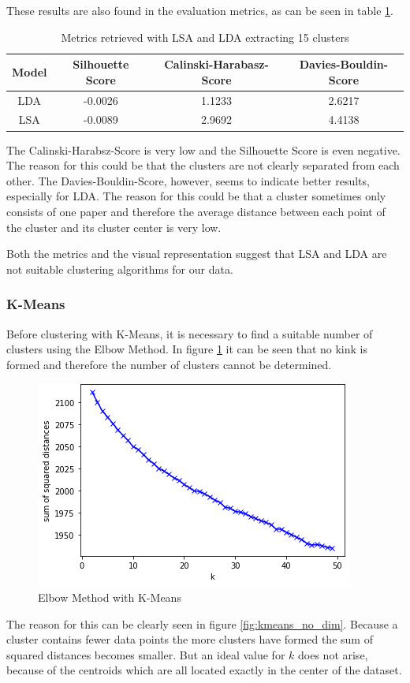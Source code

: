 These results are also found in the evaluation metrics, as can be seen in table \ref{tab:scores_lsa_lda}.
\begin{table}[]
    \centering
    \begin{tabular}{c|c|c|c}
     Model & Silhouette Score & Calinski-Harabasz-Score & Davies-Bouldin-Score  \\
     \hline
     \hline
     LDA & -0.0026 & 1.1233 & 2.6217 \\
     \hline
     LSA & -0.0089 & 2.9692 & 4.4138
    \end{tabular}
    \caption{Metrics retrieved with LSA and LDA extracting 15 clusters}
    \label{tab:scores_lsa_lda}
\end{table}
The Calinski-Harabsz-Score is very low and the Silhouette Score is even negative.
The reason for this could be that the clusters are not clearly separated from each other.
The Davies-Bouldin-Score, however, seems to indicate better results, especially for LDA.
The reason for this could be that a cluster sometimes only consists of one paper and therefore the average distance between each point of the cluster and its cluster center is very low.

Both the metrics and the visual representation suggest that LSA and LDA are not suitable clustering algorithms for our data.


\subsubsection{K-Means}\label{subsubsec:kmeans}
Before clustering with K-Means, it is necessary to find a suitable number of clusters using the Elbow Method.
In figure \ref{fig:elbow} it can be seen that no kink is formed and therefore the number of clusters cannot be determined.
\begin{figure}
    \centering
    \includegraphics[width=0.5\linewidth]{imgs/elbow.png}
    \caption{Elbow Method with K-Means}
    \label{fig:elbow}
\end{figure}
The reason for this can be clearly seen in figure \ref{fig:kmeans_no_dim}. Because a cluster contains fewer data points the more clusters have formed the sum of squared distances becomes smaller.
But an ideal value for $k$ does not arise, because of the centroids which are all located exactly in the center of the dataset.

